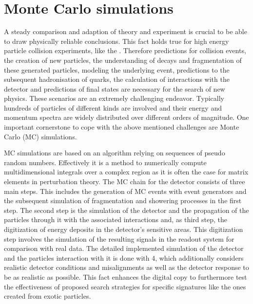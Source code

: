 \section{Monte Carlo simulations}\label{MCsim}
A steady comparison and adaption of theory and experiment is crucial to be able to draw physically reliable conclusions. This fact holds true for high energy particle collision experiments, like the {\LHC}. Therefore predictions for collision events, the creation of new particles, the understanding of decays and fragmentation of these generated particles, modeling the underlying event, predictions to the subsequent hadronisation of quarks, the calculation of interactions with the detector and predictions of final states are necessary for the search of new physics. These scenarios are an extremely challenging endeavor. Typically hundreds of particles of different kinds are involved and their energy and momentum spectra are widely distributed over different orders of magnitude. One important cornerstone to cope with the above mentioned challenges are Monte Carlo (MC) simulations. \cite{bigMC}\par
MC simulations are based on an algorithm relying on sequences of pseudo random numbers. Effectively it is a method to numerically compute multidimensional integrals over a complex region as it is often the case for matrix elements in perturbation theory. \cite{MCbook} The MC chain for the {\ATLAS} detector consists of three main steps. This includes the generation of MC events with event generators and the subsequent simulation of fragmentation and showering processes in the first step. The second step is the simulation of the detector and the propagation of the particles through it with the associated interactions and, as third step, the digitization of energy deposits in the detector's sensitive areas. This digitization step involves the simulation of the resulting signals in the readout system for comparison with real data. The detailed implemented simulation of the detector and the particles interaction with it is done with {\GEANT}4\cite{GEANT4}, which additionally considers realistic detector conditions and misalignments as well as the detector response to be as realistic as possible. This fact enhances the digital copy to furthermore test the effectiveness of proposed search strategies for specific signatures like the ones created from exotic particles. \cite{ATLASSim}
